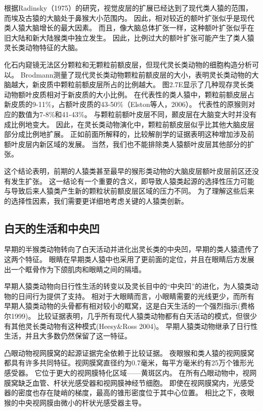 根据Radinsky（1975）的研究，视觉皮层的扩展已经达到了现代类人猿的范围，而埃及古猿的大脑处于鼻猴大小范围内。
因此，相对较近的额叶扩张似乎是现代类人猿大脑增长的最大因素。
而且，像大脑总体扩张一样，这种额叶扩张似乎在旧大陆和新大陆猴类中独立发生\cite{williams2010new}。
因此，比例过大的额叶扩张可能产生了类人猿灵长类动物特征的大脑。


化石内窥镜无法区分颗粒和无颗粒前额皮层，但现代灵长类动物的细胞构造分析可以。
Brodmann\cite{brodmann1912neue}测量了现代灵长类动物颗粒前额皮层的大小，表明灵长类动物的大脑越大，新皮质中颗粒前额皮层所占的比例越大。
图2.7E显示了几种现存灵长类动物额叶皮质相对于新皮质的大小比例。
在代表性的类人猿中，颗粒前额皮层占新皮质的9-11\%，占额叶皮质的43-50\%（Elston等人，2006）。
代表性的原猴则对应的数值为7-8\%和41-43\%。
与颗粒前额叶皮层不同，颞皮层在大脑变大时并没有成比例地变大\cite{rilling2002quantitative}。
因此，在灵长类动物演化中，颗粒前额皮层似乎比其他大脑皮层部分成比例地扩展。
正如前面所解释的，比较解剖学的证据表明这种增加涉及前额叶皮层内新区域的发展。
当然，我们也不能排除类人猿额叶皮层其他部分的扩张。


这个结论表明，前期的人猿类甚至最早的猴形类动物的大脑皮层额叶皮层前区还没有发生扩张。
这一结论有一个重要的含义，即导致人猿类起源的选择性压力可能与导致后来人猿类产生新的颗粒状前额皮层区域的压力不同。
为了理解这些后来的选择性因素，我们需要更详细地考虑关键的人猿类创新。



\subsection{白天的生活和中央凹}

早期的半猴类动物转向了白天活动并进化出灵长类的中央凹，早期的类人猿遗传了这两个特征。
眼睛在早期类人猿中也采用了更前面的定位，并且在眼睛后方发展出一个眶骨作为下颌肌肉和眼睛之间的隔墙。


早期人猿类动物向日行性生活的转变以及灵长目中的“中央凹”的进化，为人猿类动物的日间行为提供了支持。
相对于大眼睛而言，小眼睛需要的光线更少，而所有早期人猿类动物的头骨都有相对较小的眶窝，这是白天生活的一个强烈指示(费格尔1999)。
比较证据表明，几乎所有现代人猿类动物都有白天活动的模式，但很少有其他灵长类动物有这种模式(Heesy\&Ross 2004)。
早期人猿类动物继承了日行性生活，并且大多数仍然保留了这一特征。


凸眼动物视网膜窝的起源证据完全依赖于比较证据。
夜眼猴和类人猿的视网膜窝都具有许多共同特征。视网膜窝直径约为0.7毫米，每平方毫米约有25万个锥形光感受器。
它位于更大的视网膜特化区域——黄斑区内。
在所有凸眼动物中，视网膜窝缺乏血管、杆状光感受器和视网膜神经节细胞。
即使在视网膜窝内，光感受器的密度也存在陡峭的梯度，最高的锥形密度位于其中心位置。
相比之下，夜眼猴的中央视网膜由微小的杆状光感受器主导。


